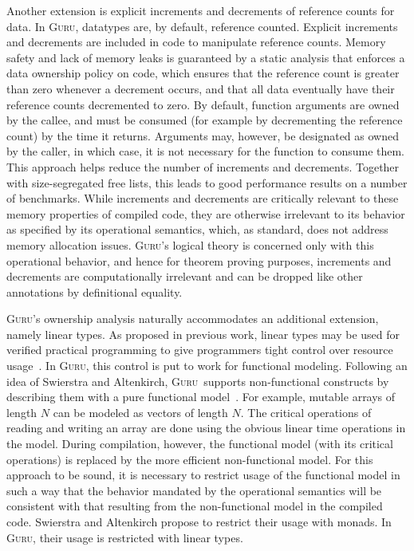\documentclass[preprint,natbib]{sigplanconf}
\newcommand{\guru}[0]{\textsc{Guru}}
\begin{document}
Another extension is explicit increments and decrements of reference
counts for data.  In \guru, datatypes are, by default, reference
counted.  Explicit increments and decrements are included in code to
manipulate reference counts.  Memory safety and lack of memory leaks
is guaranteed by a static analysis that enforces a data ownership
policy on code, which ensures that the reference count is greater than
zero whenever a decrement occurs, and that all data eventually have
their reference counts decremented to zero.  By default, function
arguments are owned by the callee, and must be consumed (for example
by decrementing the reference count) by the time it returns.
Arguments may, however, be designated as owned by the caller, in which
case, it is not necessary for the function to consume them.  This
approach helps reduce the number of increments and decrements.
Together with size-segregated free lists, this leads to good
performance results on a number of benchmarks.  While increments and
decrements are critically relevant to these memory properties of
compiled code, they are otherwise irrelevant to its behavior as
specified by its operational semantics, which, as standard, does not
address memory allocation issues.  \guru's logical theory is concerned
only with this operational behavior, and hence for theorem proving
purposes, increments and decrements are computationally irrelevant and
can be dropped like other annotations by definitional equality.

\guru's ownership analysis naturally accommodates an additional
extension, namely linear types.  As proposed in previous work, linear
types may be used for verified practical programming to give
programmers tight control over resource usage~\cite{zhuxi-padl05}.  In
\guru, this control is put to work for functional modeling.  Following
an idea of Swierstra and Altenkirch, \guru\ supports non-functional
constructs by describing them with a pure functional
model~\cite{swierstra+07}.  For example, mutable arrays of length $N$
can be modeled as vectors of length $N$.  The critical operations of
reading and writing an array are done using the obvious linear time
operations in the model.  During compilation, however, the functional
model (with its critical operations) is replaced by the more efficient
non-functional model.  For this approach to be sound, it is necessary
to restrict usage of the functional model in such a way that the
behavior mandated by the operational semantics will be consistent with
that resulting from the non-functional model in the compiled code.
Swierstra and Altenkirch propose to restrict their usage with monads.
In \guru, their usage is restricted with linear types.
\end{document}
